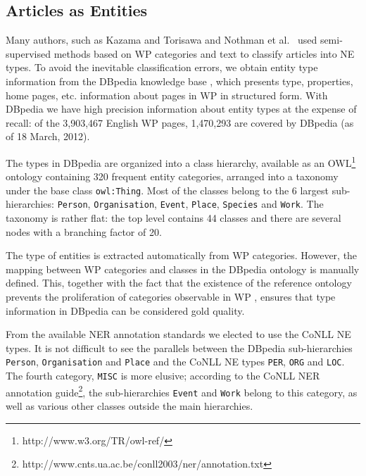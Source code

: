 \documentclass[11pt]{article}
\begin{document}
\subsection{Articles as Entities}
\label{dbpedia}

Many authors, such as Kazama and Torisawa  and Nothman et
al.~ used semi-supervised methods based on WP categories
and text to classify articles into NE types. To avoid the inevitable
classification errors, we obtain entity type information from the DBpedia
knowledge base \cite{Bizer:09}, which presents type, properties, home pages,
etc. information about pages in WP in structured form. With DBpedia we have
high precision information about entity types at the expense of recall: of the
3,903,467 English WP pages, 1,470,293 are covered by DBpedia (as of 18 March,
2012).

The types in DBpedia are organized into a class hierarchy, available as an OWL\footnote{http://www.w3.org/TR/owl-ref/}
ontology containing 320 frequent
entity categories, arranged into a taxonomy under the base class
\texttt{owl:Thing}. Most of the classes belong to the 6 largest
sub-hierarchies: \texttt{Person}, \texttt{Organisation}, \texttt{Event},
\texttt{Place}, \texttt{Species} and \texttt{Work}. The taxonomy is rather
flat: the top level contains 44 classes and there are several nodes with a
branching factor of 20.

The type of entities is extracted automatically from WP categories. However, the mapping between WP categories and classes in the DBpedia ontology is manually defined. This, together with the fact that the existence of the reference ontology prevents the proliferation of categories observable in WP \cite{Bizer:09}, ensures that type information in DBpedia can be considered gold quality.

From the available NER annotation standards we elected to use the CoNLL \cite{Tjong:03} NE types. It is not difficult to see the parallels between the DBpedia sub-hierarchies \texttt{Person}, \texttt{Organisation} and \texttt{Place} and the CoNLL NE types \texttt{PER}, \texttt{ORG} and \texttt{LOC}. The fourth category, \texttt{MISC} is more elusive; according to the CoNLL NER annotation guide\footnote{http://www.cnts.ua.ac.be/conll2003/ner/annotation.txt}, the sub-hierarchies \texttt{Event} and \texttt{Work} belong to this category, as well as various other classes outside the main hierarchies. 
\end{document}

